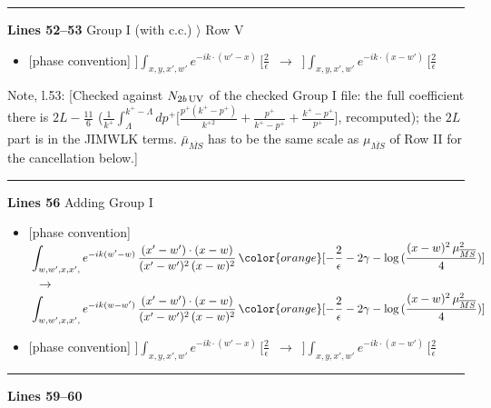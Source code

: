 \documentclass[10pt]{article}
\newenvironment{notebox}{\def\FrameCommand{{\color{notebar}\vrule width 1.5pt}\hspace{6pt}}\MakeFramed{\advance\hsize-\width\FrameRestore}\small}{\endMakeFramed}
\begin{document}
\noindent\rule{\linewidth}{0.3pt}\par\noindent\textbf{Lines 52--53} \quad \textsf{Group I (with c.c.) $\rangle$ Row V} \par
\begin{itemize}[leftmargin=2.2em,itemsep=1pt,topsep=2pt]
\item[\textbf{l.52}] \textsf{\small [phase convention]} $\displaystyle ]\int_{x,y,x',w'}e^{-ik\cdot(w'-x)}\,[\frac{2}{\epsilon}$\ $\longrightarrow$\ $\displaystyle ]\int_{x,y,x',w'}e^{-ik\cdot(x-w')}\,[\frac{2}{\epsilon}$
\end{itemize}
\begin{notebox}\textsf{\small Note, l.53:} [Checked against $N_{2b\,\rm UV}$ of the checked Group I file: the full coefficient there is $2L-\frac{11}{6}$ ($\frac{1}{k^{+}}\int_{\Lambda}^{k^{+}-\Lambda}dp^{+}\big[\frac{p^{+}(k^{+}-p^{+})}{k^{+2}}+\frac{p^{+}}{k^{+}-p^{+}}+\frac{k^{+}-p^{+}}{p^{+}}\big]$, recomputed); the $2L$ part is in the JIMWLK terms. $\bar\mu_{\overline{MS}}$ has to be the same scale as $\mu_{\overline{MS}}$ of Row II for the cancellation below.]\end{notebox}
\noindent\rule{\linewidth}{0.3pt}\par\noindent\textbf{Lines 56} \quad \textsf{Adding Group I} \par
\begin{itemize}[leftmargin=2.2em,itemsep=1pt,topsep=2pt]
\item[\textbf{l.56}] \textsf{\small [phase convention]} $\displaystyle \, \int_{w, w',x,x',} e^{-ik(w^\prime-w)}\, \frac{(x'-w')\cdot (x-w)}{(x'-w')^{2}\, (x-w)^{2}}\, {\color{orange}[-\frac{2}{\epsilon}-2\gamma-\log{(\frac{(x-w)^{2}\,\mu^{2}_{\overline{MS}}}{4})}]}$\ $\longrightarrow$\ $\displaystyle \, \int_{w, w',x,x',} e^{-ik(w-w^\prime)}\, \frac{(x'-w')\cdot (x-w)}{(x'-w')^{2}\, (x-w)^{2}}\, {\color{orange}[-\frac{2}{\epsilon}-2\gamma-\log{(\frac{(x-w)^{2}\,\mu^{2}_{\overline{MS}}}{4})}]}$
\item[\textbf{l.56}] \textsf{\small [phase convention]} $\displaystyle ]\int_{x,y,x',w'}e^{-ik\cdot(w'-x)}\,[\frac{2}{\epsilon}$\ $\longrightarrow$\ $\displaystyle ]\int_{x,y,x',w'}e^{-ik\cdot(x-w')}\,[\frac{2}{\epsilon}$
\end{itemize}
\noindent\rule{\linewidth}{0.3pt}\par\noindent\textbf{Lines 59--60} \par
\end{document}
